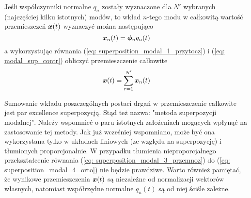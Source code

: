 Jeśli współczynniki normalne $q_n$ zostały wyznaczone dla $N'$ wybranych (najczęściej kilku istotnych) modów, to wkład $n$-tego modu w całkowitą wartość przemieszczeń $\bm{x}(t)$ wyznaczyć można następująco
\begin{equation} \label{eq: modal_sup_contr}
	\bm{x}_n(t) = \bm{\phi}_n q_n(t)
\end{equation}
a wykorzystując równania (\ref{eq: superposition_modal_1_przytocz}) i (\ref{eq: modal_sup_contr}) obliczyć przemieszczenie całkowite
\begin{equation}
		\bm{x}(t) = \sum_{r=1}^{N'} \bm{x}_n(t)
\end{equation}

Sumowanie wkładu poszczególnych postaci drgań w przemieszczenie całkowite jest par excellence superpozycją. Stąd też nazwa: "metoda superpozycji modalnej". Należy wspomnieć o paru istotnych założeniach mogących wpłynąć na zastosowanie tej metody. Jak już wcześniej wspomniano, może być ona wykorzystana tylko w układach liniowych (ze względu na superpozycję) i tłumionych proporcjonalnie. W przypadku tłumienia nieproporcjalnego przekształcenie równania (\ref{eq: superposition_modal_3_przemnoz}) do (\ref{eq: superposition_modal_4_orto}) nie będzie prawdziwe. Warto również pamiętać, że wynikowe przemieszczenia $\bm{x}(t)$ są niezależne od normalizacji wektorów własnych, natomiast współrzędne normalne $q_n(t)$ są od niej ściśle zależne. 

